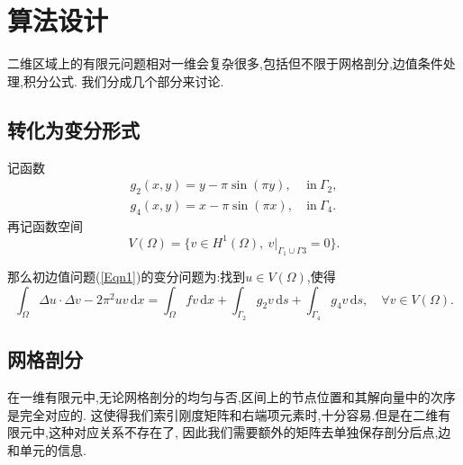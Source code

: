 \documentclass[11pt,reqno]{article}
\numberwithin{equation}{section}
\renewcommand{\d}{\,\mathrm d}
\begin{document}
\section{算法设计}

二维区域上的有限元问题相对一维会复杂很多,包括但不限于网格剖分,边值条件处理,积分公式.
我们分成几个部分来讨论.

\subsection{转化为变分形式}

记函数
\begin{equation}
	\begin{split}
		g_2(x,y)=y-\pi\sin(\pi y),\ &\mathrm{in}\ \Gamma_2,\\
		g_4(x,y)=x-\pi\sin(\pi x),\ &\mathrm{in}\ \Gamma_4.
	\end{split}
\end{equation}
再记函数空间
\begin{equation}
	V(\Omega)=\{v\in H^1(\Omega),\ v|_{\Gamma_1\cup\Gamma3}=0\}.
\end{equation}

那么初边值问题(\ref{Eqn1})的变分问题为:找到$u\in V(\Omega)$,使得
\[\int_\Omega\Delta u\cdot\Delta v-2\pi^2uv\d x=
\int_\Omega fv\d x+\int_{\Gamma_2}g_2v\d s+\int_{\Gamma_4}g_4v\d s,
\quad \forall v\in V(\Omega).\]

\subsection{网格剖分}

在一维有限元中,无论网格剖分的均匀与否,区间上的节点位置和其解向量中的次序是完全对应的.
这使得我们索引刚度矩阵和右端项元素时,十分容易.但是在二维有限元中,这种对应关系不存在了,
因此我们需要额外的矩阵去单独保存剖分后点,边和单元的信息.
\end{document}

